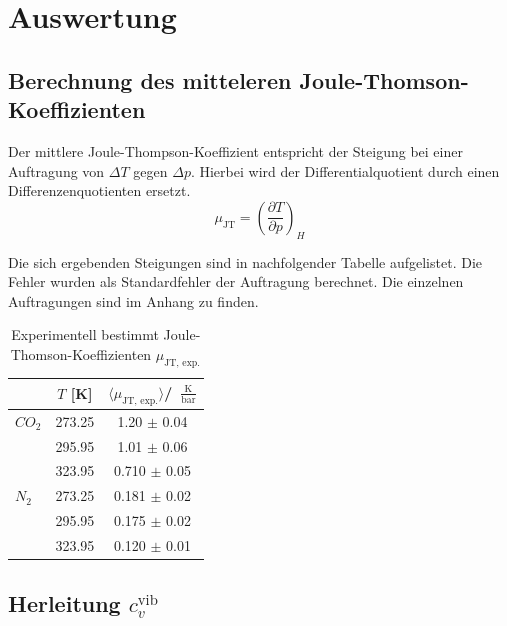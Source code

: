 \documentclass[a4paper,12pt,oneside,onecolum,final,openany]{report}
\begin{document}
\chapter{Auswertung}



\section{Berechnung des mitteleren Joule-Thomson-Koeffizienten}
Der mittlere Joule-Thompson-Koeffizient entspricht der Steigung bei einer Auftragung von $\Delta T$ gegen $\Delta p$. Hierbei wird der Differentialquotient durch einen Differenzenquotienten ersetzt.\\

\begin{equation}
\mu_\mathrm{JT} = \left(\frac{\partial T}{\partial p}\right)_H
\end{equation}

Die sich ergebenden Steigungen sind in nachfolgender Tabelle aufgelistet. Die Fehler wurden als Standardfehler der Auftragung berechnet. Die einzelnen Auftragungen sind im Anhang zu finden.\\

\begin{table} [h]
\centering
\caption{Experimentell bestimmt Joule-Thomson-Koeffizienten $\mu_{\text{JT, exp.}}$}
\begin{tabular} {l | c|  c}
	 &  $T$ [K] & $\langle \mu_{\text{JT, exp.}} \rangle$/~$\frac{\mathrm{K}}{\mathrm{bar}}$ \\
	 \hline
	  $CO_\mathrm{2}$ & 273.25 & 1.20 $\pm$ 0.04 \\
	   & 295.95 & 1.01 $\pm$ 0.06\\
	  & 323.95 & 0.710 $\pm$ 0.05\\
	\hline
	$N_2$ & 273.25 & 0.181  $\pm$  0.02\\
	& 295.95 & 0.175 $\pm$ 0.02\\
	& 323.95& 0.120 $\pm$ 0.01\\
\end{tabular}
\end{table}
\section{Herleitung $c_v^\mathrm{ vib}$}
\end{document}
